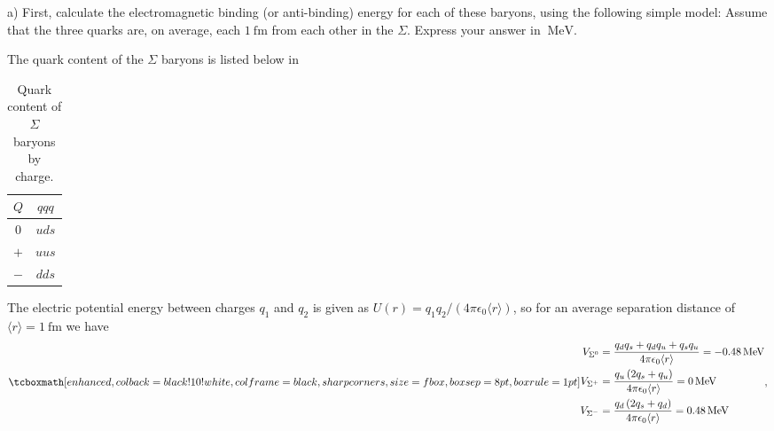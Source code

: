 \def\duedate{10/04/22}
\def\HWnum{2}

\usepackage[compat=1.1.0]{tikz-feynman}
\usepackage{subcaption}


    

a) First, calculate the electromagnetic binding (or anti-binding) energy for each of these baryons, using the following simple model: Assume that the three quarks are, on average, each $\SI{1}{\femto\m}$ from each other in the $\Sigma$.
Express your answer in $\SI{}{\MeV}$.

The quark content of the $\Sigma$ baryons is listed below in 

\begin{table}[h!]
\begin{center}
\begin{tabular}{c|c}
    $Q$ & $qqq$ \\
    \hline
    $0$ & $uds$ \\
    $+$ & $uus$ \\
    $-$ & $dds$
\end{tabular}
\end{center}
\caption{Quark content of $\Sigma$ baryons by charge.}
\label{tab:sig-quarks}
\end{table}

The electric potential energy between charges $q_1$ and $q_2$ is given as $U(r) = q_1 q_2 / (4\pi\epsilon_0\langle r \rangle)$, so for an average separation distance of $\langle r \rangle = \SI{1}{\femto\m}$ we have
\begin{eqnarray}
    \label{eq:potential-energies}
    \eqbox{
    \begin{aligned}
    V_{\Sigma^{0}} &= \frac{q_{d} q_{s} + q_{d} q_{u} + q_{s} q_{u}}{4 \pi \epsilon_{0} \langle r \rangle} = \SI{-0.48}{\MeV} \\
    V_{\Sigma^{+}} &= \frac{q_{u} \left(2 q_{s} + q_{u}\right)}{4 \pi \epsilon_{0} \langle r \rangle} = \SI{0}{\MeV} \\
    V_{\Sigma^{-}} &= \frac{q_{d} \left(2 q_{s} + q_{d}\right)}{4 \pi \epsilon_{0} \langle r \rangle} = \SI{0.48}{\MeV} 
\end{aligned}
}
,\end{eqnarray}


